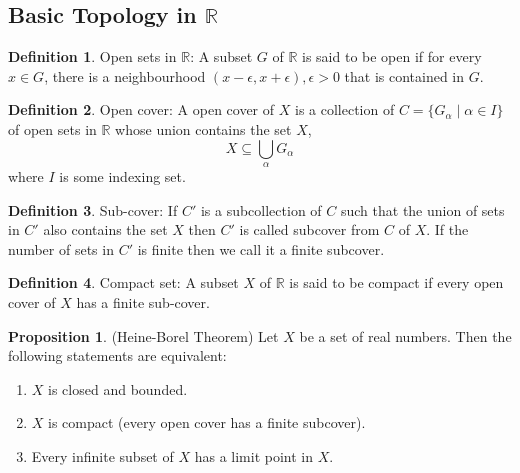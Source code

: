 \documentclass[12pt]{report}
\theoremstyle{definition}
\newtheorem{defn}{Definition}
\newtheorem{prop}{Proposition}
\begin{document}
\subsection*{Basic Topology in $\mathbb{R}$}
\begin{defn}
    Open sets in $\mathbb{R}$: A subset $G$ of $\mathbb{R}$ is said to be open if for every $x \in G$, there is a neighbourhood $(x -\epsilon, x+\epsilon), \epsilon > 0$ that is contained in $G$.
\end{defn}
\begin{defn}
    Open cover: A open cover of $X$ is a collection of $C = \{G_{\alpha} \mid \alpha \in I\}$ of open sets in $\mathbb{R}$ whose union contains the set $X$, $$ X \subseteq \bigcup\limits_{\alpha} G_{\alpha} $$ where $I$ is some indexing set.
\end{defn}
\begin{defn}
    Sub-cover: If $C'$ is a subcollection of $C$ such that the union of sets in $C'$ also contains the set $X$ then $C'$ is called subcover from $C$ of $X$. If the number of sets in $C'$ is finite then we call it a finite subcover. 
\end{defn}
\begin{defn}
    Compact set: A subset $X$ of $\mathbb{R}$ is said to be compact if every open cover of $X$ has a finite sub-cover. 
\end{defn}
\begin{prop}
    (Heine-Borel Theorem) Let $X$ be a set of real numbers. Then the following statements are equivalent:
    \begin{enumerate}
        \item $X$ is closed and bounded.
        \item $X$ is compact (every open cover has a finite subcover).
        \item Every infinite subset of $X$ has a limit point in $X$.
    \end{enumerate}
\end{prop}
\end{document}
